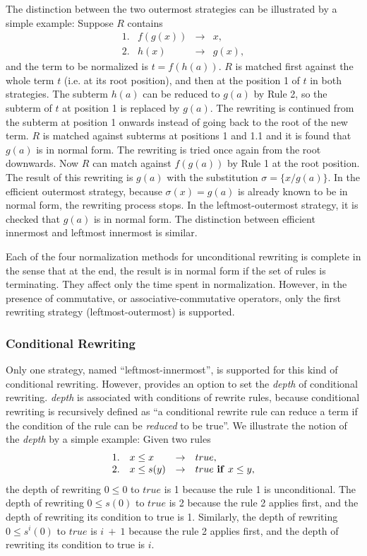 The distinction between the two outermost
strategies can be illustrated by 
a simple example: Suppose
$R$ contains
\[\begin{array}{rlcl}
  1. & f(g(x)) & \rightarrow & x, \\
  2. & h(x) & \rightarrow & g(x),
\end{array}\]
and the term to be normalized is $t = f(h(a))$.  $R$ is matched first
against the whole term $t$ (i.e. at its root position), and then at
the position 1 of $t$ in both strategies.  The subterm $h(a)$
can be reduced to $g(a)$ by Rule 2, so the subterm of $t$ at position
1 is replaced by $g(a)$. The rewriting is continued from the subterm
at position 1 onwards instead of going back to the root of the new
term.  $R$ is matched against subterms at positions 1 and 1.1 and it
is found that $g(a)$ is in normal form.  The
rewriting is tried once again from the root downwards.  Now $R$ can
match against $f(g(a))$ by Rule 1 at the root position.  The result of
this rewriting is $g(a)$ with the substitution $\sigma = \{ x/g(a)
\}$.  In the efficient outermost strategy, because $\sigma(x) = g(a)$
is already known to be in normal form,
the rewriting process stops.
In the leftmost-outermost strategy, it is checked that $g(a)$ is in normal
form. The distinction between efficient innermost and leftmost innermost
is similar.

Each of the four normalization methods for unconditional rewriting is
complete in the sense that at the end, the result is in normal form
if the set of rules is terminating.  They affect only the time spent
in normalization.  However, in the presence of commutative, or
associative-commutative operators, only the first rewriting strategy
(leftmost-outermost) is supported.

\subsubsection{Conditional Rewriting}

Only one strategy, named ``leftmost-innermost'',
is supported for this kind of conditional rewriting.
However, \RRL provides an option to set the {\em depth} of
conditional rewriting.
{\em depth} is associated with conditions of rewrite rules,
because conditional rewriting is recursively defined
as ``a conditional rewrite rule can reduce a term if the condition
of the rule can be {\em reduced} to be true''.
We illustrate the notion of 
the {\em depth} by a simple example: Given two rules
\[\begin{array}{rlll}
1. & x \leq x & \rightarrow & true, \\
2. & x \leq s(y) & \rightarrow & true~{\bf if}~ x \leq y,
\end{array}\]
the depth of rewriting $0 \leq 0$ to $true$ is 1 because 
the rule 1 is unconditional. 
The depth of rewriting 
$0 \leq s(0)$ to $true$ 
is 2 because the rule 2 applies first, and the depth of
rewriting its condition to true is 1.
Similarly, the depth of rewriting $0 \leq s^i (0)$ to $true$ is $i~+~1$
because the rule 2 applies first, and the depth of
rewriting its condition to true is $i$.

